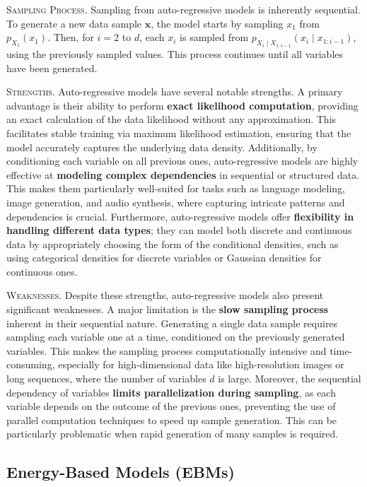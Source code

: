 \textsc{Sampling Process.} Sampling from auto-regressive models is inherently sequential. To generate a new data sample \( \mathbf{x} \), the model starts by sampling \( x_1 \) from \( p_{X_1}(x_1) \). Then, for \( i = 2 \) to \( d \), each \( x_i \) is sampled from \( p_{X_i \mid X_{1:i-1}}(x_i \mid x_{1:i-1}) \), using the previously sampled values. This process continues until all variables have been generated.

\textsc{Strengths.} Auto-regressive models have several notable strengths. A primary advantage is their ability to perform \textbf{exact likelihood computation}, providing an exact calculation of the data likelihood without any approximation. This facilitates stable training via maximum likelihood estimation, ensuring that the model accurately captures the underlying data density. Additionally, by conditioning each variable on all previous ones, auto-regressive models are highly effective at \textbf{modeling complex dependencies} in sequential or structured data. This makes them particularly well-suited for tasks such as language modeling, image generation, and audio synthesis, where capturing intricate patterns and dependencies is crucial. Furthermore, auto-regressive models offer \textbf{flexibility in handling different data types}; they can model both discrete and continuous data by appropriately choosing the form of the conditional densities, such as using categorical densities for discrete variables or Gaussian densities for continuous ones.

\textsc{Weaknesses.} Despite these strengths, auto-regressive models also present significant weaknesses. A major limitation is the \textbf{slow sampling process} inherent in their sequential nature. Generating a single data sample requires sampling each variable one at a time, conditioned on the previously generated variables. This makes the sampling process computationally intensive and time-consuming, especially for high-dimensional data like high-resolution images or long sequences, where the number of variables \( d \) is large. Moreover, the sequential dependency of variables \textbf{limits parallelization during sampling}, as each variable depends on the outcome of the previous ones, preventing the use of parallel computation techniques to speed up sample generation. This can be particularly problematic when rapid generation of many samples is required.


\subsection{Energy-Based Models (EBMs)}\label{sec:energy_based_models}

